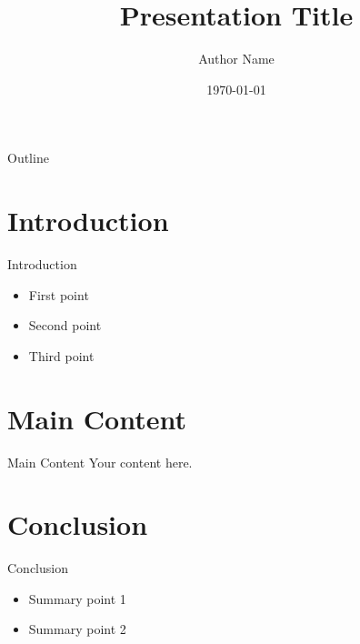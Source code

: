 \documentclass{beamer}
\title{Presentation Title}
\author{Author Name}
\institute{Institution}
\date{\today}
\begin{document}
\begin{frame}
\titlepage
\end{frame}

\begin{frame}{Outline}
\tableofcontents
\end{frame}

\section{Introduction}
\begin{frame}{Introduction}
\begin{itemize}
  \item First point
  \item Second point
  \item Third point
\end{itemize}
\end{frame}

\section{Main Content}
\begin{frame}{Main Content}
Your content here.
\end{frame}

\section{Conclusion}
\begin{frame}{Conclusion}
\begin{itemize}
  \item Summary point 1
  \item Summary point 2
\end{itemize}
\end{frame}
\end{document}
